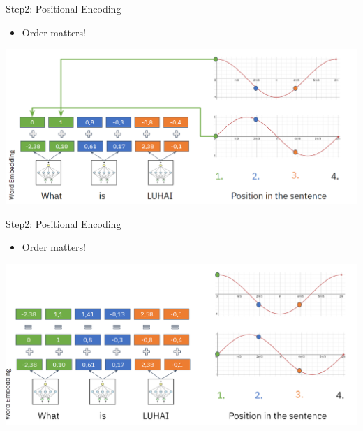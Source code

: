 \documentclass[aspectratio=169]{../latex_main/tntbeamer}  %
\begin{document}
        \begin{frame}{Step2: Positional Encoding}

            \begin{itemize}
                \item Order matters!
            \end{itemize}

            \centering
            \includegraphics[width=0.9\linewidth]{figure/transformer4.png}
        
        \end{frame}

        \begin{frame}{Step2: Positional Encoding}

            \begin{itemize}
                \item Order matters!
            \end{itemize}

            \centering
            \includegraphics[width=0.9\linewidth]{figure/transformer5.png}
        
        \end{frame}
\end{document}
